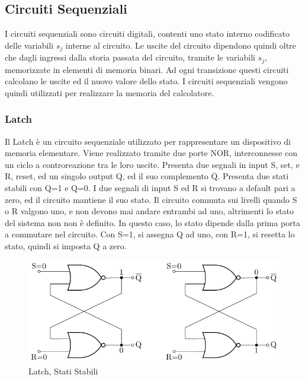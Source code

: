 \documentclass{article}
\numberwithin{equation}{subsection}
\begin{document}
\subsection{Circuiti Sequenziali}

I circuiti sequenziali sono circuiti digitali, contenti uno stato interno codificato delle variabili $s_j$ interne al circuito. 
Le uscite del circuito dipendono quindi oltre che dagli ingressi dalla storia passata del circuito, tramite le variabili $s_j$, memorizzate in elementi di memoria binari. Ad ogni transizione questi circuiti 
calcolano le uscite ed il nuovo valore dello stato. I circuiti sequenziali vengono quindi utilizzati per realizzare la memoria del calcolatore. 

\subsubsection{Latch}

Il Latch è un circuito sequenziale utilizzato per rappresentare un dispositivo di memoria elementare. Viene realizzato tramite due porte NOR, interconnesse con un ciclo a controreazione tra le loro uscite. 
Presenta due segnali in input S, set, e R, reset, ed un singolo output Q, ed il suo complemento $\overline{\mathrm{Q}}$. Presenta due stati stabili con Q=1 e Q=0. I due segnali di input S ed R si trovano 
a default pari a zero, ed il circuito mantiene il suo stato. 
Il circuito commuta sui livelli quando S o R valgono uno, e non devono mai andare entrambi ad uno, altrimenti lo stato del sistema non non è definito. In questo caso, lo stato dipende dalla prima porta a 
commutare nel circuito. 
Con S=1, si assegna Q ad uno, con R=1, si resetta lo stato, quindi si imposta Q a zero. 

\begin{figure}[H]%
    \centering%
    \includegraphics[scale=0.9]{latch.pdf}%
    \caption{Latch, Stati Stabili}%
\end{figure}
\end{document}

